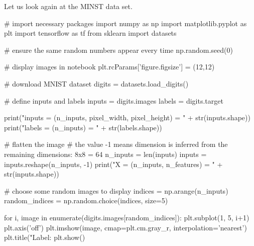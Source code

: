 \documentclass[%
oneside,                 %
final,                   %
10pt]{article}
\begin{document}
Let us look again at the MINST data set.













































\bpycod
# import necessary packages
import numpy as np
import matplotlib.pyplot as plt
import tensorflow as tf
from sklearn import datasets


# ensure the same random numbers appear every time
np.random.seed(0)

# display images in notebook
plt.rcParams['figure.figsize'] = (12,12)


# download MNIST dataset
digits = datasets.load_digits()

# define inputs and labels
inputs = digits.images
labels = digits.target

print("inputs = (n_inputs, pixel_width, pixel_height) = " + str(inputs.shape))
print("labels = (n_inputs) = " + str(labels.shape))


# flatten the image
# the value -1 means dimension is inferred from the remaining dimensions: 8x8 = 64
n_inputs = len(inputs)
inputs = inputs.reshape(n_inputs, -1)
print("X = (n_inputs, n_features) = " + str(inputs.shape))


# choose some random images to display
indices = np.arange(n_inputs)
random_indices = np.random.choice(indices, size=5)

for i, image in enumerate(digits.images[random_indices]):
    plt.subplot(1, 5, i+1)
    plt.axis('off')
    plt.imshow(image, cmap=plt.cm.gray_r, interpolation='nearest')
    plt.title("Label: %
plt.show()

\epycod
\end{document}
